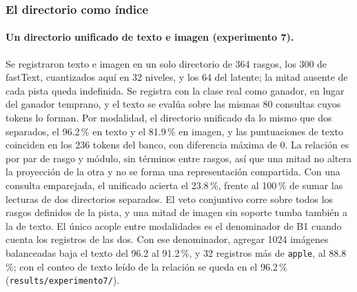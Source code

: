 \subsubsection{El directorio como índice}
\label{sec:fase4-indice}

\paragraph{Un directorio unificado de texto e imagen (experimento 7).}
Se registraron texto e imagen en un solo directorio de 364 rasgos, los 300 de fastText,
cuantizados aquí en 32 niveles, y los 64 del latente; la mitad ausente de cada pista
queda indefinida.
Se registra con la clase real como ganador, en lugar del ganador temprano, y el texto se evalúa
sobre las mismas 80 consultas cuyos tokens lo forman.
Por modalidad, el directorio unificado da lo mismo que dos separados, el 96.2\,\% en
texto y el 81.9\,\% en imagen, y las puntuaciones de texto coinciden en los 236 tokens
del banco, con diferencia máxima de 0.
La relación es por par de rasgo y módulo, sin términos entre rasgos, así que una mitad
no altera la proyección de la otra y no se forma una representación compartida.
Con una consulta emparejada, el unificado acierta el 23.8\,\%, frente al 100\,\% de
sumar las lecturas de dos directorios separados.
El veto conjuntivo corre sobre todos los rasgos definidos de la pista, y una mitad de
imagen sin soporte tumba también a la de texto.
El único acople entre modalidades es el denominador de B1 cuando cuenta los registros
de las dos.
Con ese denominador, agregar 1024 imágenes balanceadas baja el texto del 96.2 al
91.2\,\%, y 32 registros más de \texttt{apple}, al 88.8\,\%; con el conteo de texto
leído de la relación se queda en el 96.2\,\% (\texttt{results/experimento7/}).


